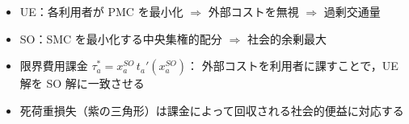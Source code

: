 \begin{tcolorbox}[
  colback=blue!4!white, colframe=blue!50!black,
  title={\small まとめ：UE・SO・混雑課金の関係},
  breakable, fonttitle=\bfseries\small
]
  \begin{itemize}\setlength{\itemsep}{2pt}
    \item UE：各利用者が PMC を最小化 $\Rightarrow$ 外部コストを無視 $\Rightarrow$ 過剰交通量
    \item SO：SMC を最小化する中央集権的配分 $\Rightarrow$ 社会的余剰最大
    \item 限界費用課金 $\tau_a^* = x_a^{SO}\, t_a'(x_a^{SO})$：
          外部コストを利用者に課すことで，UE 解を SO 解に一致させる
    \item 死荷重損失（紫の三角形）は課金によって回収される社会的便益に対応する
  \end{itemize}
\end{tcolorbox}
